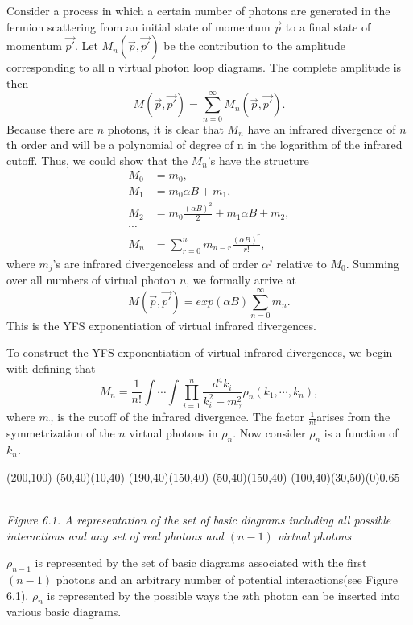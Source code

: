 Consider a process in which a certain number of photons are generated in the fermion scattering from an initial state of momentum $\vec{p}$ to a final state of momentum $\vec{p'}$. Let $M_n(\vec{p},\vec{p'})$ be the contribution to the amplitude corresponding to all n virtual photon loop diagrams. The complete amplitude is then
\begin{equation}
M(\vec{p},\vec{p'}) = \sum_{n=0}^{\infty} M_n(\vec{p},\vec{p'}).
\end{equation}
Because there are $n$ photons, it is clear that $M_n$ have an infrared divergence of $n$th order and will be a polynomial of degree of n in the logarithm of the infrared cutoff. Thus, we could show that the $M_n$'s have the structure
\begin{align}
M_0 &= m_0,\nonumber\\
M_1 &= m_0\alpha B + m_1, \nonumber\\
M_2 &= m_0\frac{(\alpha B)^2}{2} +m_1\alpha B +m_2, \nonumber\\
\cdots&\nonumber\\
M_n &= \sum_{r=0}^{n}m_{n-r}\frac{(\alpha B)^r}{r!},
\end{align} 
where $m_j$'s are infrared divergenceless and of order ${\alpha}^j$ relative to $M_0$. Summing over all numbers of virtual photon $n$, we formally arrive at 
\begin{equation}
M(\vec{p},\vec{p'}) = exp(\alpha B)\sum_{n=0}^{\infty}m_n.
\end{equation}
This is the YFS exponentiation of virtual infrared divergences.

To construct the YFS exponentiation of virtual infrared divergences, we begin with defining that
\begin{equation}
M_n=\frac{1}{n!}\int\cdots\int\prod_{i=1}^{n}\frac{d^4k_i}{k_i^2-m_{\gamma}^2}\rho_n(k_1,\cdots,k_n),
\end{equation} 
where $m_{\gamma}$ is the cutoff of the infrared divergence. The factor $\frac{1}{n!}$arises from the symmetrization of the $n$ virtual photons in $\rho_n$. Now consider $\rho_n$ is a function of $k_n$.

	\begin{center}
	\begin{axopicture}(200,100)
		\Line[arrow](50,40)(10,40)
		\Line[arrow](190,40)(150,40)
		\Line[arrow](50,40)(150,40)
		\GOval(100,40)(30,50)(0){0.65}
	\end{axopicture}
	\\{\sl Figure 6.1. A representation of the set of basic diagrams including all possible interactions and any set of real photons and $(n-1)$ virtual photons}
\end{center}
$\rho_{n-1}$ is represented by the set of basic diagrams associated with the first $(n-1)$ photons and an arbitrary number of potential interactions(see Figure 6.1). $\rho_n$ is represented by the possible ways the $n$th photon can be inserted into various basic diagrams. 

